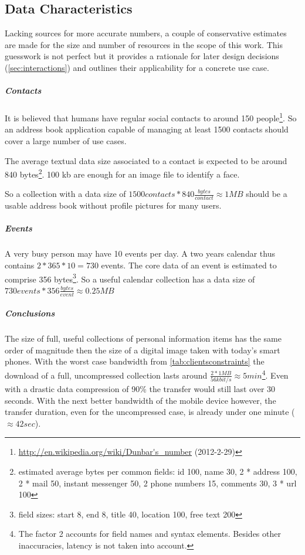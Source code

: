 \documentclass[11pt,a4paper,headsepline,twoside]{scrartcl}		%
\newcommand{\citeurl}[2]{\url{#1} (#2)}
\begin{document}
\subsection{Data Characteristics}
\label{sec:data-characteristics}

Lacking sources for more accurate numbers, a couple of conservative estimates
are made for the size and number of resources in the scope of this work. This
guesswork is not perfect but it provides a rationale for later design
decisions (\autoref{sec:interactions}) and outlines their applicability for a
concrete use case.

\subparagraph{Contacts}

It is believed that humans have regular social contacts to around 150
people\footnote{\citeurl{http://en.wikipedia.org/wiki/Dunbar's_number}{2012-2-29}}. So
an address book application capable of managing at least 1500 contacts should
cover a large number of use cases.

The average textual data size associated to a contact is expected to be around
840 bytes\footnote{estimated average bytes per common fields: id 100, name 30, 2 *
  address 100, 2 * mail 50, instant messenger 50, 2 phone numbers 15, comments
  30, 3 * url 100}. 100 kb are enough for an image file to identify a face.

So a collection with a data size of $1500 contacts * 840 \frac{bytes}{contact}
\approx 1MB$ should be a usable address book without profile pictures for many
users.

\subparagraph{Events}

A very busy person may have 10 events per day. A two years calendar thus
contains $2*365*10=730$ events. The core data of an event is estimated to
comprise 356 bytes\footnote{field sizes: start 8, end 8, title 40, location 100,
  free text 200}. So a useful calendar collection has a data size of $730 events
* 356 \frac{bytes}{event} \approx 0.25 MB$

\subparagraph{Conclusions} The size of full, useful collections of personal
information items has the same order of magnitude then the size of a digital
image taken with today's smart phones. With the worst case bandwidth from
\autoref{tab:clientsconstraints} the download of a full, uncompressed collection
lasts around $\frac{2 * 1MB}{56kbit/s} \approx 5min$\footnote{The factor 2
  accounts for field names and syntax elements. Besides other inaccuracies,
  latency is not taken into account.}. Even with a drastic data compression of
90\% the transfer would still last over 30 seconds. With the next better
bandwidth of the mobile device however, the transfer duration, even for the
uncompressed case, is already under one minute ($\approx 42 sec$).
\end{document}
